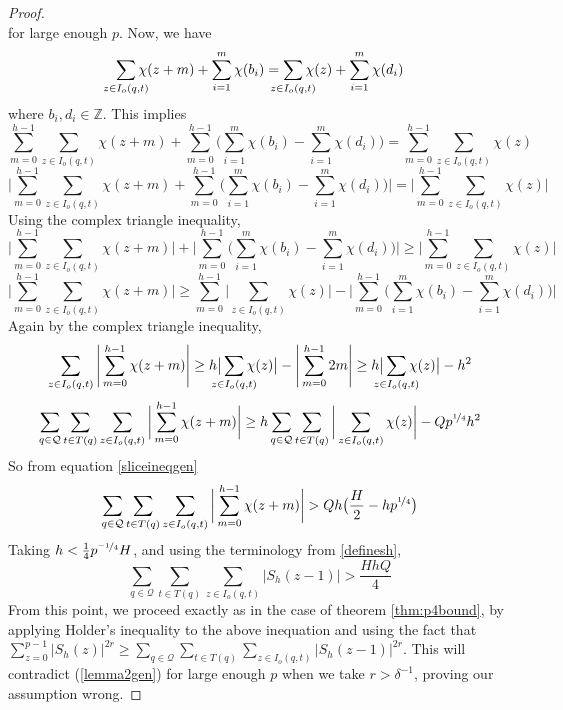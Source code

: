 \documentclass{report}
\begin{document}
\begin{proof}
\begin{equation}
\end{equation}
for large enough $p$. Now, we have
$$\sum\limits_{\mathclap {z\in I_o(q,t)}}\chi(z+m) + \sum\limits_{i=1}^m\chi(b_i)= \sum\limits_{\mathclap{z\in I_o(q,t)}}\chi(z) + \sum\limits_{i=1}^m\chi(d_i)$$
where $b_i,d_i\in\mathbb{Z}$. This implies
$$\sum\limits_{m=0}^{h-1}\sum\limits_{z\in I_o(q,t)}\chi(z+m) + \sum\limits_{m=0}^{h-1}\Big(\sum\limits_{i=1}^m\chi(b_i)-\sum\limits_{i=1}^m\chi(d_i)\Big)= \sum\limits_{m=0}^{h-1}\sum\limits_{z\in I_o(q,t)}\chi(z)$$
\[ \Bigg\lvert\sum \limits_{m=0}^{h-1}\sum\limits_{z\in I_o(q,t)}\chi(z+m) + \sum\limits_{m=0}^{h-1}\Big(\sum\limits_{i=1}^m\chi(b_i)-\sum\limits_{i=1}^m\chi(d_i)\Big)\Bigg\rvert = \Bigg\lvert \sum\limits_{m=0}^{h-1}\sum\limits_{z\in I_o(q,t)}\chi(z) \Bigg\rvert \]
Using the complex triangle inequality,
\[
\Bigg\lvert\sum\limits_{m=0}^{h-1}\sum\limits_{z\in I_o(q,t)}\chi(z+m) \Bigg\rvert + \Bigg\lvert\sum\limits_{m=0}^{h-1}\Big(\sum \limits_{i=1}^m\chi(b_i) - \sum\limits_{i=1}^m\chi(d_i)\Big)\Bigg\rvert \geq \Bigg\lvert \sum\limits_ {m=0}^{h-1} \sum\limits_{z\in I_o(q,t)}\chi(z) \Bigg\rvert
\]
$$\Bigg\lvert\sum\limits_{m=0}^{h-1}\sum\limits_{z\in I_o(q,t)}\chi(z+m)\Bigg\rvert \geq \sum\limits_ {m=0}^{h-1} \Bigg\lvert \sum\limits_{z\in I_o(q,t)}\chi(z) \Bigg\rvert -\Bigg\lvert\sum\limits_{m=0}^{h-1}\Big(\sum\limits_{i=1}^m\chi(b_i)-\sum\limits_{i=1}^m \chi(d_i)\Big)\Bigg\rvert$$
Again by the complex triangle inequality,
$$\sum\limits_{z\in I_o(q,t)} \Bigg\lvert \sum\limits_{m=0}^{h-1} \chi(z+m)\Bigg\rvert \geq h\big\lvert\sum\limits_{\mathclap{ z\in I_o(q,t)}}\chi(z)\big\rvert -\Bigg\lvert\sum\limits_{m=0}^{h-1}2m\Bigg\rvert \geq h\big\lvert\sum\limits_{\mathclap{z\in I_o(q,t)}}\chi(z)\big\rvert -h^2$$
$$\sum_{q\in\mathcal{Q}}\sum\limits_{t\in T(q)}\sum\limits_{z\in I_o(q,t)}\bigg \lvert \sum\limits_{m=0}^{h-1}\chi(z+m) \bigg \rvert \geq h\sum_{q\in\mathcal{Q}}\sum\limits_{t\in T(q)}\bigg \lvert \sum\limits_{z\in I_o(q,t)}\chi(z)\bigg \rvert-Qp^{\nicefrac{1}{4}}h^2$$
So from equation \ref{sliceineqgen}
$$\sum_{q\in\mathcal{Q}}\sum\limits_{t\in T(q)}\sum\limits_{z\in I_o(q,t)}\bigg \lvert \sum\limits_{m=0}^{h-1}\chi(z+m) \bigg \rvert > Qh\big(\frac{H}{2}-hp^{\nicefrac{1}{4}}\big)$$
Taking $h<\frac{1}{4}p^{\nicefrac{-1}{4}}H$, and using the terminology from \ref{definesh},
$$\sum_{q\in\mathcal{Q}}\sum\limits_{t\in T(q)}\sum\limits_{z\in I_o(q,t)}\lvert S_h(z-1) \rvert > \frac{HhQ}{4}$$
From this point, we proceed exactly as in the case of theorem \ref{thm:p4bound}, by applying Holder's inequality to the above inequation and using the fact that $\sum\limits_{z=0}^{p-1}\lvert S_h(z) \rvert^{2r} \geq \sum\limits_{q\in\mathcal{Q}}\sum\limits_{t\in T(q)}\sum\limits_{z\in I_o(q,t)}\lvert S_h(z-1) \rvert^{2r}$. This will contradict (\ref{lemma2gen}) for large enough $p$ when we take $r>\delta^{-1}$, proving our assumption wrong.
\end{proof}
%
\end{document}
